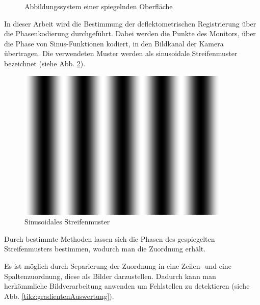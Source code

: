 \documentclass[ngerman,11pt,twocolumn,a4paper]{article}
\begin{document}
\begin{figure}[H]
\begin{adjustbox}{width=\columnwidth}
		\end{adjustbox}
		\caption{Abbildungssystem einer spiegelnden Oberfläche}
		\label{tikz:abbildungssystem}
	\end{figure}
	
	In dieser Arbeit wird die Bestimmung der deflektometrischen Registrierung über die Phasenkodierung durchgeführt.
	Dabei werden die Punkte des Monitors, über die Phase von Sinus-Funktionen kodiert, in den Bildkanal der Kamera übertragen.
	Die verwendeten Muster werden als sinusoidale Streifenmuster bezeichnet (siehe Abb. \ref{img:sinusoidalesMuster}).
	\begin{figure}[H]
		 \centering
		 \includegraphics[frame,width=0.4\columnwidth]{m_1_3}
		 \caption{Sinusoidales Streifenmuster}
		 \label{img:sinusoidalesMuster}
	\end{figure}
	
	Durch bestimmte Methoden lassen sich die Phasen des gespiegelten Streifenmusters bestimmen, wodurch man die Zuordnung erhält.
	
	\par
	Es ist möglich durch Separierung der Zuordnung in eine Zeilen- und eine Spaltenzuordnung, diese als Bilder darzustellen.
	Dadurch kann man herkömmliche Bildverarbeitung anwenden um Fehlstellen zu detektieren (siehe Abb. \ref{tikz:gradientenAuswertung}).
	
\end{document}
